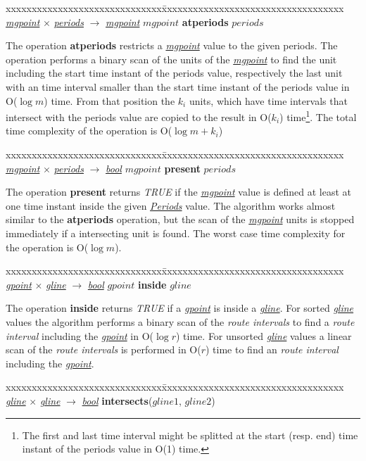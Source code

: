 \documentclass[a4paper]{article}
\newcommand{\op}[1]{\textbf{#1}}
\newcommand{\dt}[1]{\textsl{\underline{#1}}}
\newcommand{\true}{\textsl{TRUE}}
\begin{document}
\begin{tabbing}
xxxxxxxxxxxxxxxxxxxxxxxxxxxxxx\=xxxxxxxxxxxxxxxxxxxxxxxxxxxxxxxxxxx\kill
\dt{mgpoint} $\times$ \dt{periods} $\rightarrow$ \dt{mgpoint} \> $mgpoint$
\op{atperiods} $periods$\\
\end{tabbing}
The operation \op{atperiods} restricts a \dt{mgpoint} value to the given
periods. The operation performs a binary scan of the units of the \dt{mgpoint}
to find the unit including the start time instant of the periods value,
respectively the last unit with an time interval smaller than the start time
instant of the periods value in O($\log m$) time. From that position the $k_i$
units, which have time intervals that intersect with the periods value are
copied to the result in O($k_i$) time\footnote{The first and last time
interval might be splitted at the start (resp. end) time instant of the periods
value in O(1) time.}. The total time complexity of the operation is O($\log {m}
+ k_i$)
\begin{tabbing}
xxxxxxxxxxxxxxxxxxxxxxxxxxxxxx\=xxxxxxxxxxxxxxxxxxxxxxxxxxxxxxxxxxx\kill
\dt{mgpoint} $\times$ \dt{periods} $\rightarrow$ \dt{bool} \> $mgpoint$
\op{present} $periods$\\
\end{tabbing}
The operation \op{present} returns \true{} if the \dt{mgpoint} value is
defined at least at one time instant inside the given \dt{Periods} value. The
algorithm works almost similar to the \op{atperiods} operation, but
the scan of the \dt{mgpoint} units is stopped immediately if a intersecting unit
is found. The worst case time complexity for the operation is O($\log {m}$).
\begin{tabbing}
xxxxxxxxxxxxxxxxxxxxxxxxxxxxxx\=xxxxxxxxxxxxxxxxxxxxxxxxxxxxxxxxxxx\kill
\dt{gpoint} $\times$ \dt{gline} $\rightarrow$ \dt{bool} \> $gpoint$ \op{inside}
$gline$\\
\end{tabbing}
The operation \op{inside} returns \true{} if a \dt{gpoint} is inside a
\dt{gline}. For sorted \dt{gline} values the algorithm performs a binary
scan of the \textit{route intervals} to find a \textit{route interval} including
the \dt{gpoint} in O($\log r$) time. For unsorted \dt{gline} values a linear
scan of the \textit{route intervals} is performed in O($r$) time to find an
\textit{route interval}
including the \dt{gpoint}.
\begin{tabbing}
xxxxxxxxxxxxxxxxxxxxxxxxxxxxxx\=xxxxxxxxxxxxxxxxxxxxxxxxxxxxxxxxxxx\kill
\dt{gline} $\times$ \dt{gline} $\rightarrow$ \dt{bool} \>
\op{intersects}($gline1$, $gline2$)\\
\end{tabbing}
\end{document}

